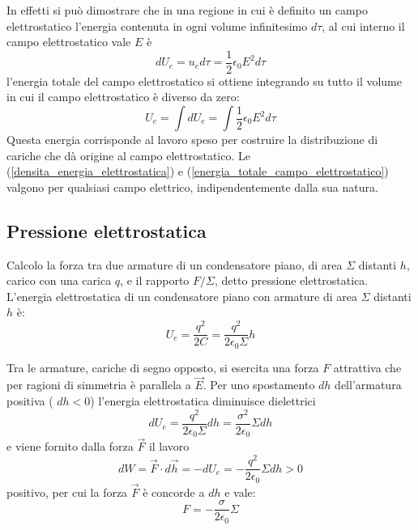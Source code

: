 \documentclass[class=book, crop=false, oneside, 12pt]{standalone}
\begin{document}
In effetti si può dimostrare che in una regione in cui è definito un campo elettrostatico l'energia contenuta in ogni volume infinitesimo \(d \tau\), al cui interno il campo elettrostatico vale \(E\) è 
\begin{equation*}
    d U_e = u_e d \tau = \frac{1}{2} \epsilon_0 E^2 d \tau
\end{equation*}
l'energia totale del campo elettrostatico si ottiene integrando su tutto il volume in cui il campo elettrostatico è diverso da zero: 
\begin{equation} \label{energia_totale_campo_elettrostatico}
    U_e = \int d U_e = \int \frac{1}{2} \epsilon_0 E^2 d \tau
\end{equation}
Questa energia corrisponde al lavoro speso per costruire la distribuzione di cariche che dà origine al campo elettrostatico. 
Le (\ref{densita_energia_elettrostatica}) e  (\ref{energia_totale_campo_elettrostatico}) valgono per qualsiasi campo elettrico, indipendentemente dalla sua natura.

\subsection{Pressione elettrostatica}

Calcolo la forza tra due armature di un condensatore piano, di area \(\Sigma\) distanti \(h\), carico con una carica \(q\), e il rapporto \(F/\Sigma\), detto pressione elettrostatica.  
L'energia elettrostatica di un condensatore piano con armature di area \(\Sigma\) distanti \(h\) è: 
\begin{equation*}
    U_e = \frac{q^2}{2 C} = \frac{q^2}{2 \epsilon_0 \Sigma} h
\end{equation*}

Tra le armature, cariche di segno opposto, si esercita una forza \(F\) attrattiva che per ragioni di simmetria è parallela a \(\overrightarrow{E}\).  
Per uno spostamento \(dh\) dell'armatura positiva ( \(dh < 0\)) l'energia elettrostatica diminuisce dielettrici
\begin{equation*}
    d U_e = \frac{q^2}{2 \epsilon_0 \Sigma} dh = \frac{\sigma^2}{2 \epsilon_0}  \Sigma dh
\end{equation*}
e viene fornito dalla forza \(\overrightarrow{F}\) il lavoro
\begin{equation*}
    d W = \overrightarrow{F} \cdot d \overrightarrow{h} = - d U_e = - \frac{q^2}{2 \epsilon_0} \Sigma dh > 0
\end{equation*}
positivo, per cui la forza \(\overrightarrow{F}\) è concorde a \(dh\) e vale:
\begin{equation}
    F =  - \frac{\sigma}{2 \epsilon_0} \Sigma 
\end{equation}
\end{document}
